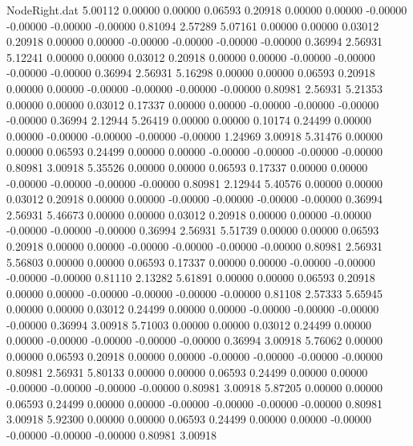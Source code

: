 \begin{filecontents}{NodeRight.dat}
   5.00112    0.00000    0.00000     0.06593    0.20918    0.00000    0.00000   -0.00000   -0.00000   -0.00000   -0.00000    0.81094    2.57289
   5.07161    0.00000    0.00000     0.03012    0.20918    0.00000    0.00000   -0.00000   -0.00000   -0.00000   -0.00000    0.36994    2.56931
   5.12241    0.00000    0.00000     0.03012    0.20918    0.00000    0.00000   -0.00000   -0.00000   -0.00000   -0.00000    0.36994    2.56931
   5.16298    0.00000    0.00000     0.06593    0.20918    0.00000    0.00000   -0.00000   -0.00000   -0.00000   -0.00000    0.80981    2.56931
   5.21353    0.00000    0.00000     0.03012    0.17337    0.00000    0.00000   -0.00000   -0.00000   -0.00000   -0.00000    0.36994    2.12944
   5.26419    0.00000    0.00000     0.10174    0.24499    0.00000    0.00000   -0.00000   -0.00000   -0.00000   -0.00000    1.24969    3.00918
   5.31476    0.00000    0.00000     0.06593    0.24499    0.00000    0.00000   -0.00000   -0.00000   -0.00000   -0.00000    0.80981    3.00918
   5.35526    0.00000    0.00000     0.06593    0.17337    0.00000    0.00000   -0.00000   -0.00000   -0.00000   -0.00000    0.80981    2.12944
   5.40576    0.00000    0.00000     0.03012    0.20918    0.00000    0.00000   -0.00000   -0.00000   -0.00000   -0.00000    0.36994    2.56931
   5.46673    0.00000    0.00000     0.03012    0.20918    0.00000    0.00000   -0.00000   -0.00000   -0.00000   -0.00000    0.36994    2.56931
   5.51739    0.00000    0.00000     0.06593    0.20918    0.00000    0.00000   -0.00000   -0.00000   -0.00000   -0.00000    0.80981    2.56931
   5.56803    0.00000    0.00000     0.06593    0.17337    0.00000    0.00000   -0.00000   -0.00000   -0.00000   -0.00000    0.81110    2.13282
   5.61891    0.00000    0.00000     0.06593    0.20918    0.00000    0.00000   -0.00000   -0.00000   -0.00000   -0.00000    0.81108    2.57333
   5.65945    0.00000    0.00000     0.03012    0.24499    0.00000    0.00000   -0.00000   -0.00000   -0.00000   -0.00000    0.36994    3.00918
   5.71003    0.00000    0.00000     0.03012    0.24499    0.00000    0.00000   -0.00000   -0.00000   -0.00000   -0.00000    0.36994    3.00918
   5.76062    0.00000    0.00000     0.06593    0.20918    0.00000    0.00000   -0.00000   -0.00000   -0.00000   -0.00000    0.80981    2.56931
   5.80133    0.00000    0.00000     0.06593    0.24499    0.00000    0.00000   -0.00000   -0.00000   -0.00000   -0.00000    0.80981    3.00918
   5.87205    0.00000    0.00000     0.06593    0.24499    0.00000    0.00000   -0.00000   -0.00000   -0.00000   -0.00000    0.80981    3.00918
   5.92300    0.00000    0.00000     0.06593    0.24499    0.00000    0.00000   -0.00000   -0.00000   -0.00000   -0.00000    0.80981    3.00918

\end{filecontents}

